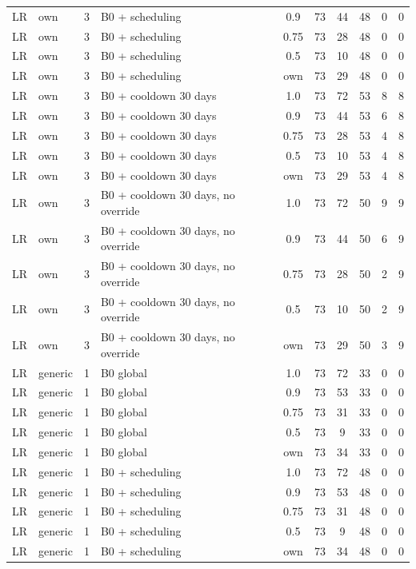 \documentclass[10pt,onecolumn,letterpaper]{article}
\begin{document}
\begin{longtable}{lllp{4.4cm}cccccc}
LR & own & 3 & B0 + scheduling & 0.9 & 73 & 44 & 48 & 0 & 0 \\
LR & own & 3 & B0 + scheduling & 0.75 & 73 & 28 & 48 & 0 & 0 \\
LR & own & 3 & B0 + scheduling & 0.5 & 73 & 10 & 48 & 0 & 0 \\
LR & own & 3 & B0 + scheduling & own & 73 & 29 & 48 & 0 & 0 \\
LR & own & 3 & B0 + cooldown 30 days & 1.0 & 73 & 72 & 53 & 8 & 8 \\
LR & own & 3 & B0 + cooldown 30 days & 0.9 & 73 & 44 & 53 & 6 & 8 \\
LR & own & 3 & B0 + cooldown 30 days & 0.75 & 73 & 28 & 53 & 4 & 8 \\
LR & own & 3 & B0 + cooldown 30 days & 0.5 & 73 & 10 & 53 & 4 & 8 \\
LR & own & 3 & B0 + cooldown 30 days & own & 73 & 29 & 53 & 4 & 8 \\
LR & own & 3 & B0 + cooldown 30 days, no override & 1.0 & 73 & 72 & 50 & 9 & 9 \\
LR & own & 3 & B0 + cooldown 30 days, no override & 0.9 & 73 & 44 & 50 & 6 & 9 \\
LR & own & 3 & B0 + cooldown 30 days, no override & 0.75 & 73 & 28 & 50 & 2 & 9 \\
LR & own & 3 & B0 + cooldown 30 days, no override & 0.5 & 73 & 10 & 50 & 2 & 9 \\
LR & own & 3 & B0 + cooldown 30 days, no override & own & 73 & 29 & 50 & 3 & 9 \\
LR & generic & 1 & B0 global & 1.0 & 73 & 72 & 33 & 0 & 0 \\
LR & generic & 1 & B0 global & 0.9 & 73 & 53 & 33 & 0 & 0 \\
LR & generic & 1 & B0 global & 0.75 & 73 & 31 & 33 & 0 & 0 \\
LR & generic & 1 & B0 global & 0.5 & 73 & 9 & 33 & 0 & 0 \\
LR & generic & 1 & B0 global & own & 73 & 34 & 33 & 0 & 0 \\
LR & generic & 1 & B0 + scheduling & 1.0 & 73 & 72 & 48 & 0 & 0 \\
LR & generic & 1 & B0 + scheduling & 0.9 & 73 & 53 & 48 & 0 & 0 \\
LR & generic & 1 & B0 + scheduling & 0.75 & 73 & 31 & 48 & 0 & 0 \\
LR & generic & 1 & B0 + scheduling & 0.5 & 73 & 9 & 48 & 0 & 0 \\
LR & generic & 1 & B0 + scheduling & own & 73 & 34 & 48 & 0 & 0 \\

\end{longtable}
\end{document}

